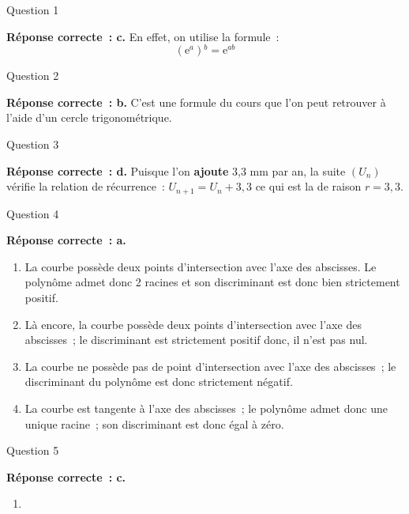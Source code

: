 \begin{corrige}
     \begin{h2}Question 1\end{h2}
     \textbf{Réponse correcte~: c.}
     \newpar
     En effet, on utilise la formule~:
     \[
     \left( \text{e}^{ a } \right){}^{ b }=\text{e}^{ ab }
     \]
     \begin{h2}Question 2\end{h2}
     \textbf{Réponse correcte~: b.}
     \newpar
     C'est une formule du cours que l'on peut retrouver à l'aide d'un cercle trigonométrique.
     \begin{h2}Question 3\end{h2}
     \textbf{Réponse correcte~: d.}
     \newpar
     Puisque l'on \textbf{ajoute} 3,3 mm par an, la suite $( U_{ n } )$ vérifie la relation de récurrence~:
     \newpar
     $U_{ n+1 }=U_{ n }+3,3$
     \newpar
     ce qui est la  de raison $r=3,3.$
     \begin{h2}Question 4\end{h2}
     \textbf{Réponse correcte~: a.}
     \newpar
     \begin{enumerate}[label=\alph*.]
          \item
          La courbe possède deux points d'intersection avec l'axe des abscisses. Le polynôme admet donc  2 racines et son discriminant est donc bien strictement positif.
          \item
          Là encore, la courbe possède deux points d'intersection avec l'axe des abscisses~; le discriminant est strictement positif donc, il n'est pas nul.
          \item
          La courbe ne possède pas de point d'intersection avec l'axe des abscisses~; le discriminant du polynôme est donc strictement négatif.
          \item
          La courbe est tangente à l'axe des abscisses~; le polynôme admet donc une unique racine~; son discriminant est donc égal à zéro.
     \end{enumerate}
     \begin{h2}Question 5\end{h2}
     \textbf{Réponse correcte~: c.}
     \begin{enumerate}[label=\alph*.]
          \item

\end{enumerate}
\end{corrige}
